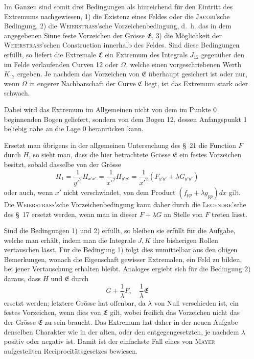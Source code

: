 \documentclass[11pt,a4paper,leqno]{article}
\begin{document}
Im Ganzen sind somit drei Bedingungen als hinreichend für den Eintritt des Extremums nachgewiesen, 1) die Existenz eines Feldes oder die \textsc{Jacobi}'sche Bedingung, 2) die \textsc{Weierstrass}'sche Vorzeichenbedingung, d.~h. das in dem angegebenen Sinne feste Vorzeichen der Grösse $\mathfrak{E}$, 3) die Möglichkeit der \textsc{Weierstrass}'schen Construction innerhalb des Feldes. Sind diese Bedingungen erfüllt, so liefert die Extremale $\mathfrak{C}$ ein Extremum des Integrals $J_{12}$ gegenüber den im Felde verlaufenden Curven 12 oder $\Omega$, welche einen vorgeschriebenen Werth $K_{12}$ ergeben. Je nachdem das Vorzeichen von $\mathfrak{E}$ überhaupt gesichert ist oder nur, wenn $\Omega$ in engerer Nachbarschaft der Curve $\mathfrak{C}$ liegt, ist das Extremum stark oder schwach.

Dabei wird das Extremum im Allgemeinen nicht von dem im Punkte 0 beginnenden Bogen geliefert, sondern von dem
Bogen 12, dessen Anfangspunkt 1 beliebig nahe an die Lage 0 heranrücken kann.

Ersetzt man übrigens in der allgemeinen Untersuchung des \S~21 die Function $F$ durch $H$, so sieht man, dass die hier betrachtete Grösse $\mathfrak{E}$ ein festes Vorzeichen besitzt, sobald dasselbe von der Grösse
\[
H_1=\frac{1}{y'^2}H_{x'x'}=\frac{1}{x'^2}H_{y'y'}=
\frac{1}{x'^2}(F_{y'y'}+\lambda G_{y'y'})
\]
oder auch, wenn $x'$ nicht verschwindet, von dem Product $(f_{pp}+\lambda g_{pp})dx$ gilt. Die \textsc{Weierstrass}'sche Vorzeichenbedingung kann daher durch die \textsc{Legendre}'sche des \S~17 ersetzt werden, wenn man in dieser $F+\lambda G$ an Stelle von $F$ treten lässt.

Sind die Bedingungen 1) und 2) erfüllt, so bleiben sie erfüllt für die Aufgabe, welche man erhält, indem man die Integrale $J,K$ ihre bisherigen Rollen vertauschen lässt. Für die Bedingung 1) folgt dies unmittelbar aus den obigen Bemerkungen, wonach die Eigenschaft gewisser Extremalen, ein Feld zu bilden, bei jener Vertauschung erhalten bleibt. Analoges ergiebt sich für die Bedingung 2) daraus, dass $H$ und $\mathfrak{E}$ durch
\[
G+\frac{1}{\lambda}F,
\quad
\frac{1}{\lambda}\mathfrak{E}
\]
ersetzt werden; letztere Grösse hat offenbar, da $\lambda$ von Null verschieden ist, ein festes Vorzeichen, wenn dies von $\mathfrak{E}$ gilt, wobei freilich das Vorzeichen nicht das der Grösse $\mathfrak{E}$ zu sein braucht. Das Extremum hat daher in der neuen Aufgabe denselben Charakter wie in der alten, oder den entgegengesetzten, je nachdem $\lambda$ positiv oder negativ ist. Damit ist der einfachste Fall eines von \textsc{Mayer} aufgestellten Reciprocitätsgesetzes bewiesen.
\end{document}
